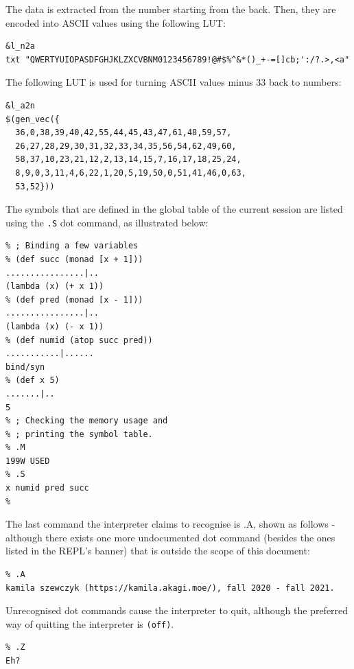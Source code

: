 \par The data is extracted from the number starting from the back. Then, they are encoded into ASCII values using the following LUT:

\begin{verbatim}
&l_n2a
txt "QWERTYUIOPASDFGHJKLZXCVBNM0123456789!@#$%^&*()_+-=[]cb;':/?.>,<a"
\end{verbatim}

\par The following LUT is used for turning ASCII values minus 33 back to numbers:

\begin{verbatim}
&l_a2n
$(gen_vec({
  36,0,38,39,40,42,55,44,45,43,47,61,48,59,57,
  26,27,28,29,30,31,32,33,34,35,56,54,62,49,60,
  58,37,10,23,21,12,2,13,14,15,7,16,17,18,25,24,
  8,9,0,3,11,4,6,22,1,20,5,19,50,0,51,41,46,0,63,
  53,52}))
\end{verbatim}

\par The symbols that are defined in the global table of the current session are listed using the \verb|.S| dot command, as illustrated below:

\begin{verbatim}
% ; Binding a few variables
% (def succ (monad [x + 1]))
................|..
(lambda (x) (+ x 1))
% (def pred (monad [x - 1]))
................|..
(lambda (x) (- x 1))
% (def numid (atop succ pred))
...........|......
bind/syn
% (def x 5)
.......|..
5
% ; Checking the memory usage and
% ; printing the symbol table.
% .M
199W USED
% .S
x numid pred succ
%
\end{verbatim}

\par The last command the interpreter claims to recognise is .A, shown as follows - although there exists one more undocumented dot command (besides the ones listed in the REPL's banner) that is outside the scope of this document:

\begin{verbatim}
% .A
kamila szewczyk (https://kamila.akagi.moe/), fall 2020 - fall 2021.
\end{verbatim}

\par Unrecognised dot commands cause the interpreter to quit, although the preferred way of quitting the interpreter is \verb|(off)|.

\begin{verbatim}
% .Z
Eh?
\end{verbatim}

